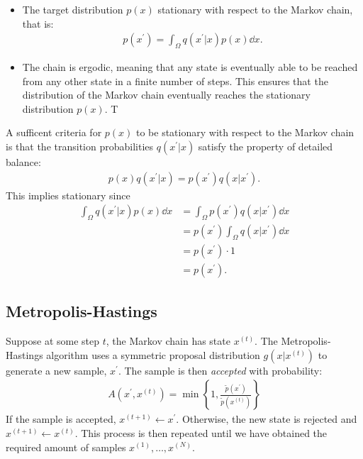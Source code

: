 \begin{itemize}
    \item The target distribution $p(x)$ stationary with respect to the Markov chain, that is:
    \begin{align} \label{eq:stationarity}
        p(x^\prime) = \int_{\Omega} q(x^\prime| x) p(x) \dd{x}.
    \end{align}
    
    \item The chain is ergodic, meaning that any state is eventually able to be reached from any other state in a finite number of steps.
    This ensures that the distribution of the Markov chain eventually reaches the stationary distribution $p(x)$.
    T
    
\end{itemize}
A sufficent criteria for $p(x)$ to be stationary with respect to the Markov chain is that the transition probabilities $q(x^\prime|x)$ satisfy the property of detailed balance:
\begin{align*}
    p(x)q(x^\prime | x) = p(x^\prime)q(x| x^\prime).
\end{align*}
This implies stationary since
\begin{equation}
    \begin{aligned}    
        \int_{\Omega} q(x^\prime | x) p(x) \dd{x} 
        &= \int_{\Omega}  p(x^\prime)q(x| x^\prime) \dd{x} \\ 
        &=  p(x^\prime) \int_{\Omega} q(x| x^\prime) \dd{x} \\
        &=  p(x^\prime) \cdot 1 \\
        &= p(x^\prime).
    \end{aligned}
\end{equation}
\subsection{Metropolis-Hastings}

Suppose at some step $t$, the Markov chain has state $x^{(t)}$.
The Metropolis-Hastings algorithm uses a symmetric proposal distribution $g(x|x^{(t)})$ to generate a new sample, $x^\prime$.
The sample is then \emph{accepted} with probability:
\begin{align}
    A(x^{\prime}, x^{(t)}) = \min\left\{1, \frac{\tilde{p}(x^\prime)}{\tilde{p}(x^{(t)})}\right\}
\end{align}
If the sample is accepted, $x^{(t+1)} \gets x^\prime$.
Otherwise, the new state is rejected and $x^{(t+1)} \gets x^{(t)}$.
This process is then repeated until we have obtained the required amount of samples $x^{(1)},\dots,x^{(N)}$. 


